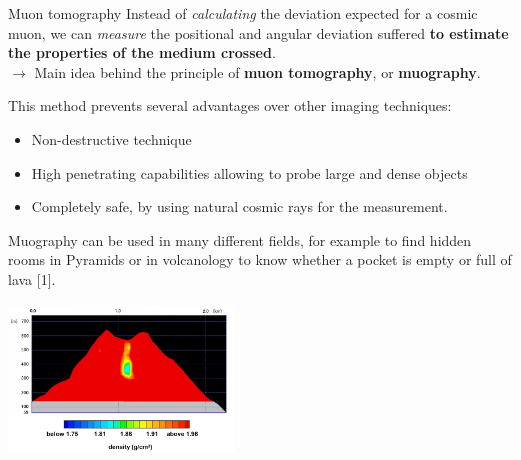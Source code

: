 \documentclass[8 pt]{beamer}
\begin{document}
\begin{frame}{Muon tomography}
Instead of \textit{calculating} the deviation expected for a cosmic muon, we can \textit{measure} the positional and angular deviation suffered \textbf{to estimate the properties of the medium crossed}. \\
\hspace{10pt} $\rightarrow$ Main idea behind the principle of \textbf{\alert{muon tomography}}, or \textbf{\alert{muography}}. \vfill


\begin{minipage}[c]{.49\textwidth}
\justifying
This method prevents several advantages over other imaging techniques:
\begin{itemize}
\justifying
\item Non-destructive technique
\item High penetrating capabilities allowing to probe large and dense objects
\item Completely safe, by using natural cosmic rays for the measurement.
\end{itemize} \vspace{10pt}

	Muography can be used in many different fields, for example to find hidden rooms in Pyramids or in volcanology to know whether a pocket is empty or full of lava [1].
\end{minipage} \hfill
\begin{minipage}[c]{.49\textwidth}
	\begin{center}
	\includegraphics[width=6cm, height=4cm]{figs/volcano.jpg}
	\end{center}
\end{minipage} \hfill \vfill
\end{frame}
\end{document}
